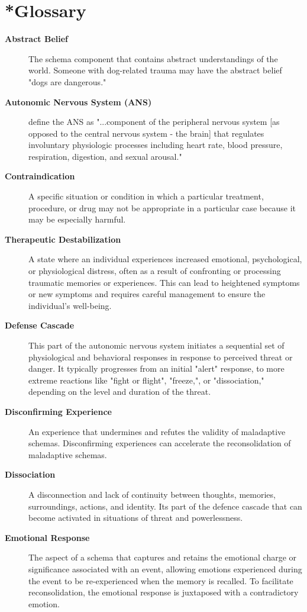 \documentclass[12pt,letterpaper]{article}
\begin{document}
\section{*Glossary}
\label{sec:glossary}
\begin{description}
    \item[\textbf{Abstract Belief}] The schema component that contains abstract understandings of the world. Someone with dog-related trauma may have the abstract belief "dogs are dangerous."
    \item[\textbf{Autonomic Nervous System (ANS)}] \textcite{waxenbaum2019ANS} define the ANS as "...component of the peripheral nervous system [as opposed to the central nervous system - the brain] that regulates involuntary physiologic processes including heart rate, blood pressure, respiration, digestion, and sexual arousal."
    \item[\textbf{Contraindication}] A specific situation or condition in which a particular treatment, procedure, or drug may not be appropriate in a particular case because it may be especially harmful.
    \item[\textbf{Therapeutic Destabilization}] A state where an individual experiences increased emotional, psychological, or physiological distress, often as a result of confronting or processing traumatic memories or experiences. This can lead to heightened symptoms or new symptoms and requires careful management to ensure the individual's well-being.
    \item[\textbf{Defense Cascade}] This part of the autonomic nervous system initiates a sequential set of physiological and behavioral responses in response to perceived threat or danger. It typically progresses from an initial "alert" response, to more extreme reactions like "fight or flight", "freeze,", or "dissociation," depending on the level and duration of the threat.
    \item[\textbf{Disconfirming Experience}] An experience that undermines and refutes the validity of maladaptive schemas. Disconfirming experiences can accelerate the reconsolidation of maladaptive schemas.
    \item[\textbf{Dissociation}] A disconnection and lack of continuity between thoughts, memories, surroundings, actions, and identity. Its part of the defence cascade that can become activated in situations of threat and powerlessness.
    \item[\textbf{Emotional Response}] The aspect of a schema that captures and retains the emotional charge or significance associated with an event, allowing emotions experienced during the event to be re-experienced when the memory is recalled. To facilitate reconsolidation, the emotional response is juxtaposed with a contradictory emotion.

\end{description}
\end{document}
